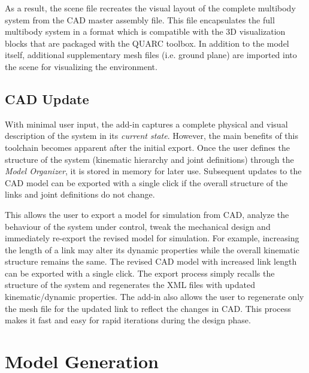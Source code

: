 As a result, the scene file recreates the visual layout of the complete multibody system from the CAD master assembly file. This file encapsulates the full multibody system in a format which is compatible with the 3D visualization blocks that are packaged with the QUARC toolbox. In addition to the model itself, additional supplementary mesh files (i.e. ground plane) are imported into the scene for visualizing the environment.

\subsection{CAD Update} %
\label{sub:cad_update}
With minimal user input, the add-in captures a complete physical and visual description of the system in its \emph{current state}. However, the main benefits of this toolchain becomes apparent after the initial export. Once the user defines the structure of the system (kinematic hierarchy and joint definitions) through the \emph{Model Organizer}, it is stored in memory for later use. Subsequent updates to the CAD model can be exported with a single click if the overall structure of the links and joint definitions do not change.

This allows the user to export a model for simulation from CAD, analyze the behaviour of the system under control, tweak the mechanical design and immediately re-export the revised model for simulation. For example, increasing the length of a link may alter its dynamic properties  while the overall kinematic structure remains the same. The revised CAD model with increased link length can be exported with a single click. The export process simply recalls the structure of the system and regenerates the XML files with updated kinematic/dynamic properties. The add-in also allows the user to regenerate only the mesh file for the updated link to reflect the changes in CAD. This process makes it fast and easy for rapid iterations during the design phase.


\section{Model Generation} %
\label{sec:model_generation}

